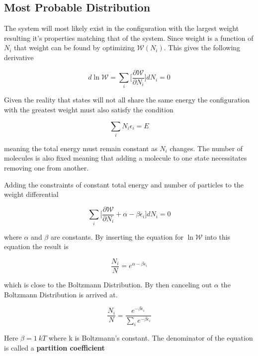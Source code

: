 \documentclass[a4paper, 12 pt]{article}
\begin{document}
\begin{flushleft}
\subsection{Most Probable Distribution}

The system will most likely exist in the configuration with the largest weight resulting it's properties matching that of the system. Since weight is a function of $N_i$ that weight can be found by optimizing $\mathscr{W}(N_i)$. This gives the following derivative

\begin{equation*}
    d \ln{\mathscr{W}} = \sum_i \big[ \frac{\partial \mathscr{W}}{\partial N_i} \big] dN_i = 0
\end{equation*}

Given the reality that states will not all share the same energy the configuration with the greatest weight must also satisfy the condition

\begin{equation*}
    \sum_i N_i \epsilon_i = E
\end{equation*}

meaning the total energy must remain constant as $N_i$ changes. The number of molecules is also fixed meaning that adding a molecule to one state necessitates removing one from another.

Adding the constraints of constant total energy and number of particles to the weight differential 

\begin{equation*}
    \sum_i \big[ \frac{\partial \mathscr{W}}{\partial N_i} + \alpha - \beta \epsilon_i \big] dN_i = 0
\end{equation*}

where $\alpha$ and $\beta$ are constants. By inserting the equation for $\ln{\mathscr{W}}$ into this equation the result is

\begin{equation*}
    \frac{N_i}{N} = e^{\alpha - \beta \epsilon_i}
\end{equation*}

which is close to the Boltzmann Distribution. By then canceling out $\alpha$ the Boltzmann Distribution is arrived at.

\begin{equation*}
    \frac{N_i}{N} = \frac{e^{-\beta \epsilon_i}}{\sum_i e^{-\beta \epsilon_i}}
\end{equation*}

Here $\beta = 1 \ kT$ where k is Boltzmann's constant. The denominator of the equation is called a \textbf{partition coefficient}


\end{flushleft}
\end{document}
